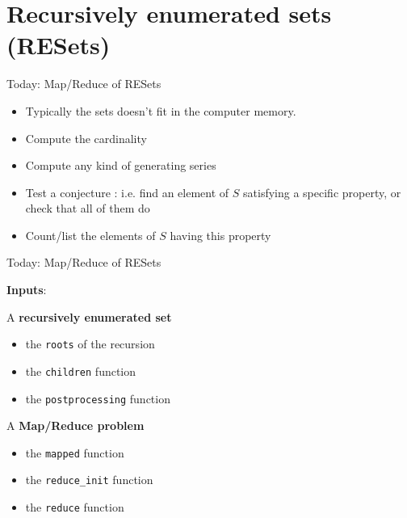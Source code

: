\documentclass[compress,11pt]{beamer}
\begin{document}
\section{Recursively enumerated sets (RESets)}
\begin{frame}[fragile]{Today: Map/Reduce of RESets}

  \begin{center}
  \end{center}
  \bigskip\pause

  \begin{itemize}
  \item Typically the sets doesn't fit in the computer memory.
    \bigskip

  \item Compute the cardinality
  \item Compute any kind of generating series
  \item Test a conjecture : i.e. find an element of $S$ satisfying a specific
    property, or check that all of them do
  \item Count/list the elements of $S$ having this property
  \end{itemize}
\end{frame}

\begin{frame}[fragile]{Today: Map/Reduce of RESets}

  \textbf{Inputs}:
  \bigskip

  A \textbf{recursively enumerated set}
  \begin{itemize}
  \item the \texttt{roots} of the recursion
  \item the \texttt{children} function
  \item the \texttt{postprocessing} function
  \end{itemize}
  A \textbf{Map/Reduce problem}
  \begin{itemize}
  \item the \texttt{mapped} function
  \item the \verb|reduce_init| function
  \item the \texttt{reduce} function
  \end{itemize}
\end{frame}
\end{document}

